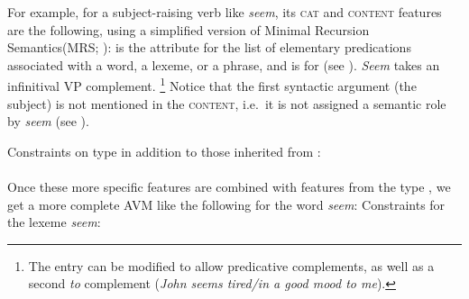 \documentclass[output=paper,biblatex,babelshorthands,newtxmath,draftmode,colorlinks,citecolor=brown]{langscibook}
\begin{document}
For example, for a subject-raising verb like \emph{seem}, its \textsc{cat} and \textsc{content}
features are the following, using a simplified version of Minimal Recursion Semantics\indexmrs (MRS; \citealp{CFPS2005a}):  is the
attribute for the list of elementary predications associated with a word, a lexeme, or a phrase, and
 is for  (see ). 
\emph{Seem} takes an infinitival VP complement.%
%
\footnote{The entry can be modified to allow predicative complements, as well as a second \emph{to} complement (\emph{John seems tired/in a good mood to me}).}
%
Notice that the first syntactic argument (the subject) is not mentioned in the
  \textsc{content}, i.e.\ it is not assigned a semantic role by \emph{seem} (see
).

\ea
Constraints on type  in addition to those inherited from :\label{ex:prop23}\\
 \impl\\
\z
%
\largerpage[1.2]
Once these more specific features are combined with features from the type , we get a
more complete AVM like the following for the word \emph{seem}:
\ea\label{ex:prop24}
Constraints for the lexeme \emph{seem}:\\
\z
\end{document}
